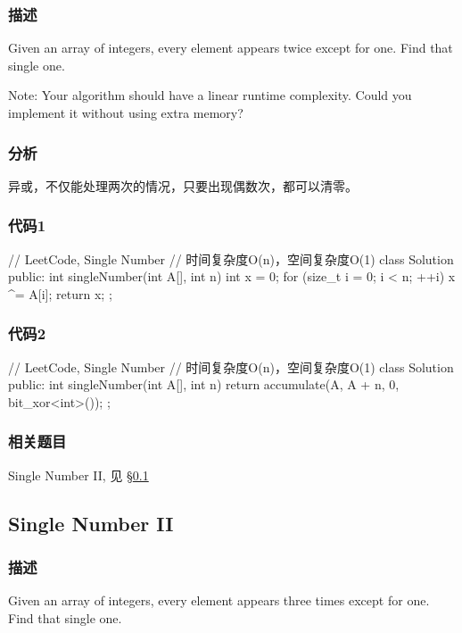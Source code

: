 \subsubsection{描述}
Given an array of integers, every element appears twice except for one. Find 
that single one.

Note:
Your algorithm should have a linear runtime complexity. Could you implement it 
without using extra memory?


\subsubsection{分析}
异或，不仅能处理两次的情况，只要出现偶数次，都可以清零。


\subsubsection{代码1}
\begin{Code}
	// LeetCode, Single Number
	// 时间复杂度O(n)，空间复杂度O(1)
	class Solution {
		public:
		int singleNumber(int A[], int n) {
			int x = 0;
			for (size_t i = 0; i < n; ++i)
			x ^= A[i];
			return x;
		}
	};
\end{Code}


\subsubsection{代码2}
\begin{Code}
	// LeetCode, Single Number
	// 时间复杂度O(n)，空间复杂度O(1)
	class Solution {
		public:
		int singleNumber(int A[], int n) {
			return accumulate(A, A + n, 0, bit_xor<int>());
		}
	};
\end{Code}


\subsubsection{相关题目}
\begindot
\item  Single Number II, 见 \S \ref{sec:single-number-ii}
\myenddot


\subsection{Single Number II} %
\label{sec:single-number-ii}


\subsubsection{描述}
Given an array of integers, every element appears three times except for one. 
Find that single one.

